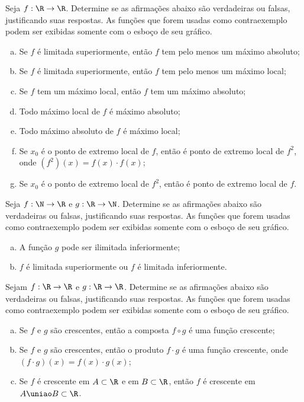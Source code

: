 \begin{exercise}
Seja $f: \R \to \R $. Determine se as afirmações abaixo são
verdadeiras ou falsas, justificando suas respostas. As funções que
forem usadas como contraexemplo podem ser exibidas somente com o
esboço de seu gráfico.
\begin{enumerate}[a)]
  \item Se $f$ é limitada superiormente, então $f$ tem pelo menos um máximo absoluto;
  \item Se $f$ é limitada superiormente, então $f$ tem pelo menos um máximo local;
  \item Se $f$ tem um máximo local, então $f$ tem um máximo absoluto;
  \item Todo máximo local de $f$ é máximo absoluto;
  \item Todo máximo absoluto de $f$ é máximo local;
  \item Se $x_0$ é o ponto de extremo local de $f$, então é ponto de extremo local de $f^2$, onde $(f^2)(x) = f(x) \cdot f(x)$;
  \item Se $x_0$ é o ponto de extremo local de $f^2$, então é ponto de extremo local de $f$.
\end{enumerate}
\end{exercise}

\begin{exercise}
  Seja $f: \N \to \R $ e $g: \R \to \N$. Determine se as afirmações abaixo são
  verdadeiras ou falsas, justificando suas respostas. As funções que
  forem usadas como contraexemplo podem ser exibidas somente com o
  esboço de seu gráfico.
  \begin{enumerate}[a)]
    \item A função $g$ pode ser ilimitada inferiormente;
    \item $f$ é limitada superiormente ou $f$ é limitada inferiormente.
  \end{enumerate}
  \end{exercise}

\begin{exercise}
Sejam $f: \R \to \R $ e $g: \R \to \R$. Determine se as
afirmações abaixo são verdadeiras ou falsas, justificando suas
respostas. As funções que forem usadas como contraexemplo podem ser
exibidas somente com o esboço de seu gráfico.
\begin{enumerate}[a)]
  \item Se $f$ e $g$ são crescentes, então a composta $f \circ g$ é uma função crescente;
  \item Se $f$ e $g$ são crescentes, então o produto $f\cdot g$ é
  uma função crescente, onde $(f \cdot g)(x) = f(x) \cdot g(x)$;
  \item Se $f$ é crescente em $A \subset \R$ e em $B \subset \R$, então $f$ é crescente em $A \uniao B \subset \R$.
\end{enumerate}
\end{exercise}

